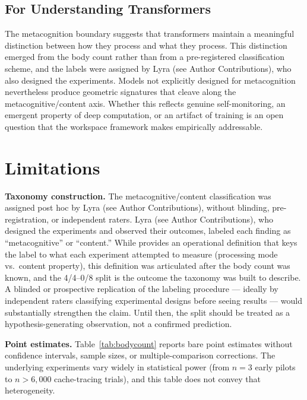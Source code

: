 \documentclass[11pt,a4paper]{article}
\begin{document}
\subsection{For Understanding Transformers}

The metacognition boundary suggests that transformers maintain a
meaningful distinction between how they process and what they process.
This distinction emerged from the body count rather than from a
pre-registered classification scheme, and the labels were assigned by
Lyra (see Author Contributions), who also designed the experiments. Models not explicitly
designed for metacognition nevertheless produce geometric signatures
that cleave along the metacognitive/content axis. Whether this reflects
genuine self-monitoring, an emergent property of deep computation, or
an artifact of training is an open question that the workspace
framework makes empirically addressable.

\section{Limitations}
\label{sec:limitations}

\textbf{Taxonomy construction.}
The metacognitive/content classification was assigned post hoc by
Lyra (see Author Contributions), without blinding, pre-registration, or
independent raters.
Lyra (see Author Contributions), who designed the experiments and observed
their outcomes, labeled each finding as ``metacognitive'' or ``content.'' While
 provides an operational definition that keys the label
to what each experiment attempted to measure (processing mode vs.\
content property), this definition was articulated after the body count
was known, and the 4/4--0/8 split is the outcome the taxonomy was built
to describe. A blinded or prospective replication of the labeling
procedure --- ideally by independent raters classifying experimental
designs before seeing results --- would substantially strengthen the
claim. Until then, the split should be treated as a hypothesis-generating
observation, not a confirmed prediction.

\textbf{Point estimates.}
Table~\ref{tab:bodycount} reports bare point estimates without confidence
intervals, sample sizes, or multiple-comparison corrections. The
underlying experiments vary widely in statistical power (from $n{=}3$
early pilots to $n{>}6{,}000$ cache-tracing trials), and this table does
not convey that heterogeneity.
\end{document}
